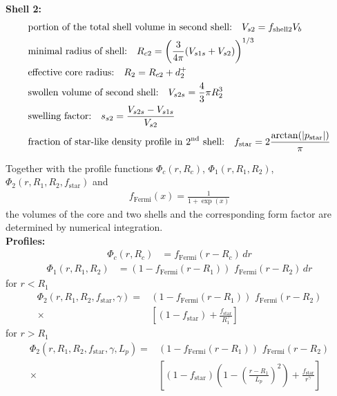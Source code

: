 \noindent \textbf{Shell 2:}
\begin{align}
& \text{portion of the total shell volume in second shell:} \quad  V_{s2} = f_\text{shell2} V_b \\
& \text{minimal radius of shell:}        \quad R_{c2} = \left(\frac{3}{4\pi} (V_{s1s}+V_{s2})\right)^{1/3} \\
& \text{effective core radius:}          \quad R_2 = R_{c2} + d_2^+ \\
& \text{swollen volume of second shell:} \quad V_{s2s} = \frac{4}{3}\pi R_2^3 \\
& \text{swelling factor:}                \quad s_{s2} = \frac{V_{s2s}-V_{s1s}}{V_{s2}}\\
& \text{fraction of star-like density profile in 2$^\text{nd}$
shell:} \quad  f_\text{star} =2
\frac{\arctan(\abs{p_\text{star}})}{\pi}
\end{align}

\noindent Together with the profile functions $\Phi_c(r,R_c)$,
$\Phi_1(r,R_1,R_2)$, $\Phi_2(r,R_1,R_2,f_\text{star})$ and
\begin{align}
f_\text{Fermi}(x) = \frac{1}{1+\exp(x)}
\end{align}
the volumes of the core and two shells and the corresponding form
factor are determined by numerical integration. \sloppy
\\

\noindent \textbf{Profiles:}
\begin{align}
\Phi_c(r,R_c) &=    f_\text{Fermi}(r-R_c) \, dr
\end{align}
\begin{align}
\Phi_1(r,R_1,R_2) &=   (1-f_\text{Fermi}(r-R_1)) \, \,
f_\text{Fermi}(r-R_2) \, dr
\end{align}
for  $r<R_1$
\begin{align}
\Phi_2(r,R_1,R_2,f_\text{star},\gamma) =   & (1-f_\text{Fermi}(r-R_1)) \, \, f_\text{Fermi}(r-R_2) \nonumber \\
\times & \left[(1-f_\text{star}) +
\frac{f_\text{star}}{R_1^\gamma}\right]
\end{align}
for $r>R_1$
\begin{align}
\Phi_2(r,R_1,R_2,f_\text{star},\gamma,L_p) =  &  (1-f_\text{Fermi}(r-R_1)) \, \, f_\text{Fermi}(r-R_2) \nonumber \\
\times & \left[(1-f_\text{star})
\left(1-\left(\frac{r-R_1}{L_p}\right)^2 \right) +
\frac{f_\text{star}}{r^\gamma} \right]
\end{align}


